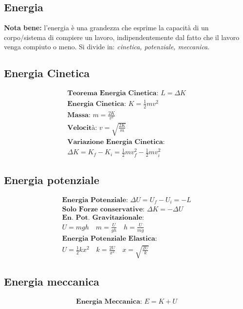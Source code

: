 \subsection{Energia}
\textbf{Nota bene: } l'energia è una grandezza che esprime la capacità di un corpo/sistema di compiere un lavoro, indipendentemente dal fatto che il lavoro venga compiuto o meno. Si divide in: \textit{cinetica, potenziale, meccanica}.

\subsection{Energia Cinetica}

\begin{gather*}
    \textbf{Teorema Energia Cinetica: } L = \Delta K \\
    \textbf{Energia Cinetica: } K = \frac{1}{2} m v^2 \\
    \textbf{Massa: } m = \frac{2K}{v^2} \\
    \textbf{Velocità: } v = \sqrt{\frac{2K}{m}} \\
    \textbf{Variazione Energia Cinetica: } \\ \Delta K = K_f - K_i = \frac{1}{2} m v_f^2 - \frac{1}{2} m v_i^2
\end{gather*}

\subsection{Energia potenziale}

\begin{gather*}
    \textbf{Energia Potenziale: } \Delta U = U_f - U_i = -L \\
    \textbf{Solo Forze conservative: } \Delta K = - \Delta U \\
    \textbf{En. Pot. Gravitazionale: } \\
    U = m g h \quad
    m = \frac{U}{gh} \quad
    h = \frac{U}{mg} \\
    \textbf{Energia Potenziale Elastica: } \\
    U = \frac{1}{2} k x^2 \quad
    k = \frac{2U}{x^2} \quad
    x = \sqrt{\frac{2U}{k}}
\end{gather*}

\subsection{Energia meccanica}

\begin{gather*}
    \textbf{Energia Meccanica: } E = K + U \\
\end{gather*}
